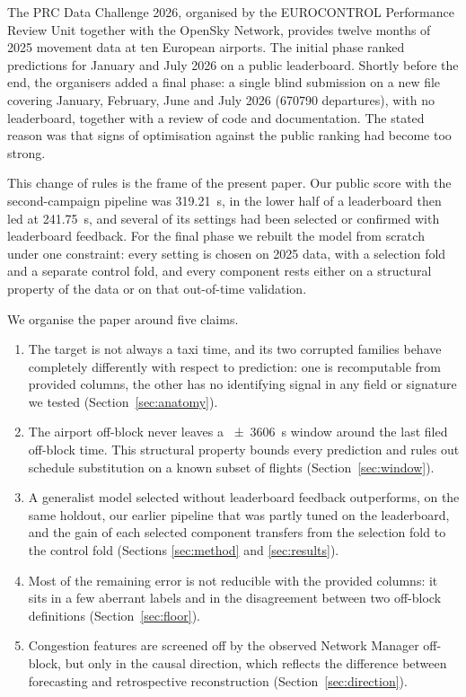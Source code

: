 \documentclass[11pt,a4paper]{article}
\begin{document}
The PRC Data Challenge 2026, organised by the EUROCONTROL Performance Review
Unit together with the OpenSky Network, provides twelve months of 2025
movement data at ten European airports. The initial phase ranked predictions
for January and July 2026 on a public leaderboard. Shortly before the end, the
organisers added a final phase: a single blind submission on a new file
covering January, February, June and July 2026 (\num{670790} departures), with
no leaderboard, together with a review of code and documentation. The stated
reason was that signs of optimisation against the public ranking had become
too strong.

This change of rules is the frame of the present paper. Our public score with
the second-campaign pipeline was \SI{319.21}{\second}, in the lower half of a
leaderboard then led at \SI{241.75}{\second}, and several of its settings had been
selected or confirmed with leaderboard feedback. For the final phase we
rebuilt the model from scratch under one constraint: every setting is chosen
on 2025 data, with a selection fold and a separate control fold, and every
component rests either on a structural property of the data or on that
out-of-time validation.

We organise the paper around five claims.

\begin{enumerate}
\item The target is not always a taxi time, and its two corrupted families
behave completely differently with respect to prediction: one is recomputable
from provided columns, the other has no identifying signal in any field or
signature we tested (Section~\ref{sec:anatomy}).
\item The airport off-block never leaves a \SI{\pm 3606}{\second} window
around the last filed off-block time. This structural property bounds every
prediction and rules out schedule substitution on a known subset of flights
(Section~\ref{sec:window}).
\item A generalist model selected without leaderboard feedback outperforms,
on the same holdout, our earlier pipeline that was partly tuned on the
leaderboard, and the gain of
each selected component transfers from the selection fold to the control fold
(Sections \ref{sec:method} and \ref{sec:results}).
\item Most of the remaining error is not reducible with the provided columns:
it sits in a few aberrant labels and in the disagreement between two
off-block definitions (Section~\ref{sec:floor}).
\item Congestion features are screened off by the observed Network Manager
off-block, but only in the causal direction, which reflects the difference
between forecasting and retrospective reconstruction
(Section~\ref{sec:direction}).
\end{enumerate}
\end{document}
